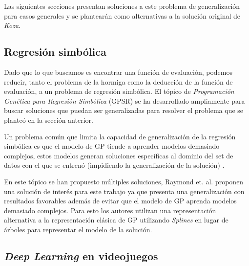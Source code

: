     Las siguientes secciones presentan soluciones a este problema de generalización para casos 
    generales y se plantearán como alternativas a la solución original de \textit{Koza}.


  \subsection{Regresión simbólica}
    \label{sec:regresion-simb}
    Dado que lo que buscamos es encontrar una función de evaluación, podemos reducir, tanto el 
    problema de la hormiga como la deducción de la función de evaluación, a un problema de regresión
    simbólica.
    El tópico de \textit{Programación Genética para Regresión Simbólica} (GPSR) se ha desarrollado 
    ampliamente para buscar soluciones que puedan ser generalizadas para resolver el problema que se
    planteó en la sección anterior.

    Un problema común que limita la capacidad de generalización de la regresión simbólica es que
    el modelo de GP tiende a aprender modelos demasiado complejos, estos modelos generan 
    soluciones específicas al dominio del set de datos con el que se entrenó (impidiendo la 
    generalización de la solución) \cite{raymondMultiobjectiveGeneticProgramming2021}.

    En este tópico se han propuesto múltiples soluciones, Raymond et. al. 
    \cite{raymondAdaptiveWeightedSplines2020,raymondMultiobjectiveGeneticProgramming2021} proponen
    una solución de interés para este trabajo ya que presenta una generalización con resultados
    favorables además de evitar que el modelo de GP aprenda modelos demasiado complejos.
    Para esto los autores utilizan una representación alternativa a la representación clásica de
    GP utilizando \textit{Splines} en lugar de árboles para representar el modelo de la solución.
    
  \subsection{\textit{Deep Learning} en videojuegos}
    
